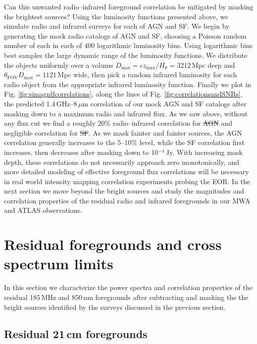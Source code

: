 \documentclass[numberedappendix]{emulateapj}
\newcommand{\maxtext}{\text{max}}
\providecommand{\DIFadd}[1]{{\protect\color{blue}\uwave{#1}}} %
\providecommand{\DIFdel}[1]{{\protect\color{red}\sout{#1}}}                      %
\providecommand{\DIFaddbegin}{} %
\providecommand{\DIFaddend}{} %
\providecommand{\DIFdelbegin}{} %
\providecommand{\DIFdelend}{} %
\begin{document}
Can this unwanted radio--infrared foreground correlation be mitigated by masking the brightest sources? Using the luminosity functions presented above, we simulate radio and infrared surveys for each of AGN and SF. We begin by generating the mock radio catalogs of AGN and SF, choosing a Poisson random number of each in each of 400 logarithmic luminosity bins. Using logarithmic bins best samples the large dynamic range of the luminosity functions. We distribute the objects uniformly over a volume $D_\maxtext=cz_\maxtext/H_0=3212$\,Mpc deep and $\theta_{\text{FOV}}D_\maxtext=1121$\,Mpc wide, then pick a random infrared luminosity for each radio object from the appropriate infrared luminosity function. Finally we plot in Fig. \ref{fig:simagnlfcorrelations}, along the lines of Fig. \ref{fig:correlationsandSNRs}, the predicted 1.4\,GHz--8\,$\mu$m correlation of our mock AGN and SF catalogs after masking down to a maximum radio and infrared flux. As we saw above, without any flux cut we find a roughly 20\% radio--infrared correlation for \DIFdelbegin \DIFdel{AGN }\DIFdelend \DIFaddbegin \DIFadd{SF }\DIFaddend and negligible correlation for \DIFdelbegin \DIFdel{SF}\DIFdelend \DIFaddbegin \DIFadd{AGN}\DIFaddend . As we mask fainter and fainter sources, the AGN correlation generally increases to the 5--10\% level, while the SF correlation first increases, then decreases after masking down to 10$^{-4}$\,Jy. With increasing mask depth, these correlations do not necessarily approach zero monotonically, and more detailed modeling of effective foreground flux correlations will be necessary in real world intensity mapping correlation experiments probing the EOR. In the next section we move beyond the bright sources and study the magnitudes and correlation properties of the residual radio and infrared foregrounds in our MWA and ATLAS observations.


\section{Residual foregrounds and cross spectrum limits}

In this section we characterize the power spectra and correlation properties of the residual 185\,MHz and 850\,nm foregrounds after subtracting and masking  the the bright sources identified by the surveys discussed in the previous section.

\subsection{Residual 21\,cm foregrounds}
\label{sec:res21fgs}
\end{document}
